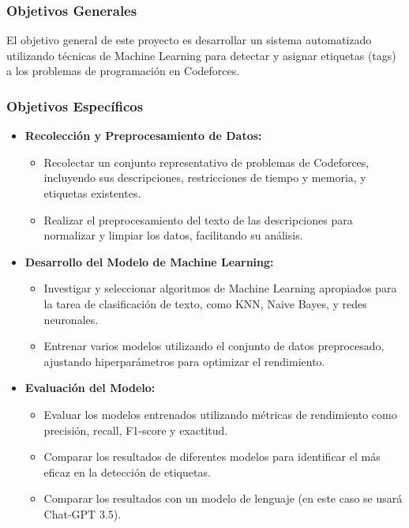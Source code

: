 \documentclass{article}
\begin{document}
\subsubsection{Objetivos Generales}

El objetivo general de este proyecto es desarrollar un sistema automatizado utilizando técnicas de Machine Learning para detectar y asignar etiquetas (tags) a los problemas de programación en Codeforces.


\subsubsection{Objetivos Específicos}

\begin{itemize}
    \item \textbf{Recolección y Preprocesamiento de Datos:}
          \begin{itemize}
              \item Recolectar un conjunto representativo de problemas de Codeforces, incluyendo sus descripciones, restricciones de tiempo y memoria, y etiquetas existentes.
              \item Realizar el preprocesamiento del texto de las descripciones para normalizar y limpiar los datos, facilitando su análisis.
          \end{itemize}
          
    \item \textbf{Desarrollo del Modelo de Machine Learning:}
          \begin{itemize}
              \item Investigar y seleccionar algoritmos de Machine Learning apropiados para la tarea de clasificación de texto, como KNN, Naive Bayes, y redes neuronales.
              \item Entrenar varios modelos utilizando el conjunto de datos preprocesado, ajustando hiperparámetros para optimizar el rendimiento.
          \end{itemize}
          
    \item \textbf{Evaluación del Modelo:}
          \begin{itemize}
              \item Evaluar los modelos entrenados utilizando métricas de rendimiento como precisión, recall, F1-score y exactitud.
              \item Comparar los resultados de diferentes modelos para identificar el más eficaz en la detección de etiquetas.
              \item Comparar los resultados con un modelo de lenguaje (en este caso se usará Chat-GPT 3.5).
          \end{itemize}
          

\end{itemize}
\end{document}
